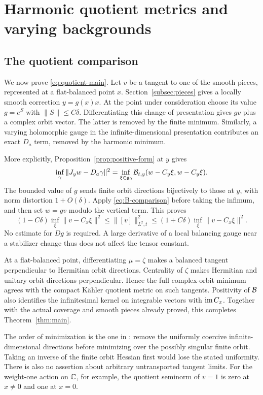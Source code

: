 \section{Harmonic quotient metrics and varying backgrounds}\label{sec:quotients}

\subsection{The quotient comparison}
We now prove \eqref{eq:quotient-main}. Let $v$ be a tangent to one
of the smooth pieces, represented at a flat-balanced point $x$.
Section~\ref{subsec:pieces} gives a locally smooth correction
$y=g(x)x$. At the point under consideration choose its value
$g=e^S$ with $\|S\|\le C\delta$.
Differentiating this change of presentation gives $gv$ plus a
complex orbit vector. The latter is removed by the finite minimum.
Similarly, a varying holomorphic gauge in the infinite-dimensional
presentation contributes an exact $D_a$ term, removed by the
harmonic minimum.

More explicitly, Proposition~\ref{prop:positive-form} at $y$ gives
\[
 \inf_{\gamma}\|J_yw-D_a\gamma\|^2
       =\inf_{\xi\in\mathfrak g_0}\mathcal B_{t,y}(w-C_y\xi,w-C_y\xi).
\]
The bounded value of $g$ sends finite orbit directions bijectively
to those at $y$, with norm distortion $1+O(\delta)$.
Apply \eqref{eq:B-comparison} before taking the infimum, and then
set $w=gv$ modulo the vertical term. This proves
\[
 (1-C\delta)\inf_{\xi}\|v-C_x\xi\|^2
 \le\|[v]\|_{L^2,t}^2
 \le(1+C\delta)\inf_{\xi}\|v-C_x\xi\|^2.
\]
No estimate for $Dg$ is required. A large derivative of a local
balancing gauge near a stabilizer change thus does not affect
the tensor constant.

At a flat-balanced point, differentiating $\mu=\zeta$ makes a
balanced tangent perpendicular to Hermitian orbit directions.
Centrality of $\zeta$ makes Hermitian and unitary orbit directions
perpendicular. Hence the full complex-orbit minimum agrees with
the compact K\"ahler quotient metric on such tangents.
Positivity of $\mathcal B$ also identifies the infinitesimal kernel on
integrable vectors with $\operatorname{im} C_x$. Together with the actual
coverage and smooth pieces already proved, this completes
Theorem~\ref{thm:main}.

The order of minimization is the one in
\cite[Section~8]{wuebben6}: remove the uniformly coercive
infinite-dimensional directions before minimizing over the
possibly singular finite orbit. Taking an inverse of the finite
orbit Hessian first would lose the stated uniformity.
There is also no assertion about arbitrary untransported tangent
limits. For the weight-one action on $\mathbb C$, for example, the quotient
seminorm of $v=1$ is zero at $x\ne0$ and one at $x=0$.

